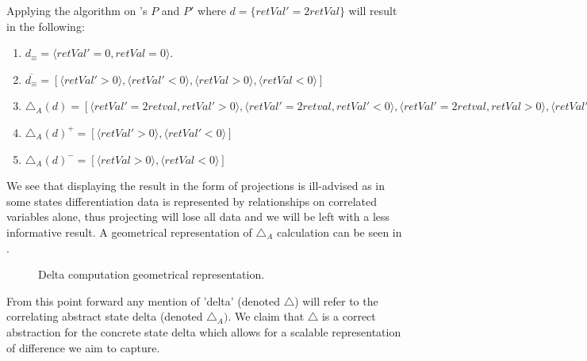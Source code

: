 \begin{Example}
Applying the algorithm on 's $P$ and $P'$ where $d = \{ retVal' = 2retVal \}$ will result in the following:
\begin{enumerate}
\item $d_{\equiv} = \langle retVal' = 0, retVal = 0 \rangle$.
\item $\overline{d_{\equiv}} = [ \langle retVal' > 0 \rangle, \langle retVal' < 0 \rangle, \langle retVal > 0 \rangle, \langle retVal < 0 \rangle ]$
\item $\triangle_{A}(d)  = [ \langle retVal' = 2retval, retVal' > 0 \rangle, \langle retVal' = 2retval, retVal' < 0 \rangle, \langle retVal' = 2retval, retVal > 0 \rangle, \langle retVal' = 2retval, retVal < 0 \rangle ]$
\item $\triangle_{A}(d)^{+} = [ \langle retVal' > 0 \rangle, \langle retVal' < 0 \rangle ]$
\item $\triangle_{A}(d)^{-} = [\langle retVal > 0 \rangle, \langle retVal < 0 \rangle]$
\end{enumerate}
\end{Example}
We see that displaying the result in the form of projections is ill-advised as in some states differentiation data is represented by relationships on correlated variables alone, thus projecting will lose all data and we will be left with a less informative result. A geometrical representation of $\triangle_{A}$ calculation can be seen in .


\begin{figure}
\caption{Delta computation geometrical representation.}
\end{figure}

%

From this point forward any mention of 'delta' (denoted $\triangle$) will refer to the correlating abstract state delta (denoted $\triangle_{A})$. We claim that $\triangle$ is a correct abstraction for the concrete state delta which allows for a scalable representation of difference we aim to capture.
